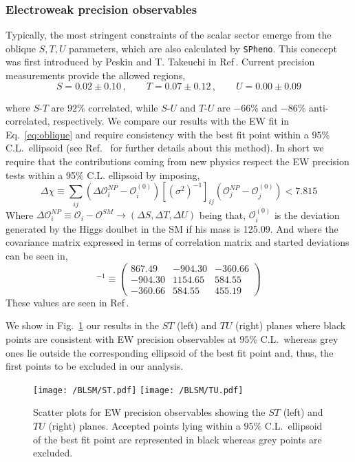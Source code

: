 \subsubsection{Electroweak precision observables}

Typically, the most stringent constraints of the scalar sector emerge from the oblique $S,T,U$ parameters, which are also calculated by \texttt{SPheno}. 
%
This conecept was first introduced by Peskin and T. Takeuchi in Ref\,\cite{Peskin1992}.
%
Current precision measurements provide the allowed regions,
%
\begin{equation}
	S = 0.02 \pm 0.10\,, \qquad T = 0.07 \pm 0.12\,, \qquad U = 0.00 \pm 0.09
	\label{eq:oblique}
\end{equation}

%
where $S$-$T$ are $92\%$ correlated, while $S$-$U$ and $T$-$U$ are $-66\%$ and $-86\%$ anti-correlated, respectively.
%
We compare our results with the EW fit in Eq.~\eqref{eq:oblique} and require consistency with the best fit point within a $95\%$ C.L.~ellipsoid (see Ref.~\cite{Costa:2014qga} for further details about this method). %
%
In short we require that the contributions coming from new physics respect the EW precision tests within a 95\% C.L. ellipsoid by imposing, 
%
\begin{equation}
\Delta \chi \equiv \sum_{ij}  \left(  \Delta \mathcal{O}_{i}^{NP} - \mathcal{O}_{i}^{(0)} \right) [ ( \sigma^2 )^{-1} ]_{ij}  \left(  \mathcal{O}_{j}^{NP} - \mathcal{O}_{j}^{(0)}  \right) < 7.815    
\end{equation}
%
Where $\Delta \mathcal{O}_i^{NP} \equiv \mathcal{O}_i - \mathcal{O}^{SM} \rightarrow (\Delta S , \Delta T , \Delta U )$ being that, $\mathcal{O}_i^{(0)}$ is the deviation generated by the Higgs doulbet in the SM if his mass is 125.09. And where the covariance matrix expressed in terms of correlation matrix and started deviations can be seen in, 
\begin{equation}
[ \sigma^2 ]^{-1} \equiv \begin{pmatrix}
867.49 & −904.30 & -360.66\\
−904.30 & 1154.65 & 584.55 \\
−360.66 & 584.55 &  455.19
\end{pmatrix}  
\end{equation}
These values are seen in Ref\,\cite{Baak_2012}. 

We show in Fig.~\ref{fig:STU} our results in the $ST$ (left) and $TU$ (right) planes where black points are consistent with EW precision observables at $95\%$ C.L.~whereas grey ones lie outside the corresponding ellipsoid of the best fit point and, thus, the first points to be excluded in our analysis. 
\begin{figure}[H]
	\centering
	\texttt{[image: /BLSM/ST.pdf]}
	\texttt{[image: /BLSM/TU.pdf]}
	\caption{Scatter plots for EW precision observables showing the $ST$ (left) and $TU$ (right) planes. Accepted points lying within a $95\%$ C.L.~ellipsoid of the best fit point are represented in black whereas grey points are excluded.}
	\label{fig:STU}
\end{figure}	

